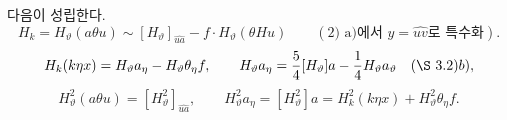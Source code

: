 
다음이 성립한다.
\[
H_k=H_\vartheta(a\theta u)\sim[H_\vartheta]_{\widehat{ua}}-f\cdot H_\vartheta(\theta Hu)\qquad(\text{2) a)에서 }y=\widehat{uv}\text{로 특수화}).
\]
\[
H_k(k\eta x)=H_\vartheta a_\eta-H_\vartheta\theta_\eta f,
\qquad
H_\vartheta a_\eta=\frac54[H_\vartheta]a-\frac14H_\vartheta a_\vartheta
\quad(\S\ 3. 2)b),
\]
\[
H_\vartheta^2(a\theta u)=[H_\vartheta^2]_{\widehat{ua}},
\qquad
H_\vartheta^2a_\eta=[H_\vartheta^2]a=H_k^2(k\eta x)+H_\vartheta^2\theta_\eta f.
\]
